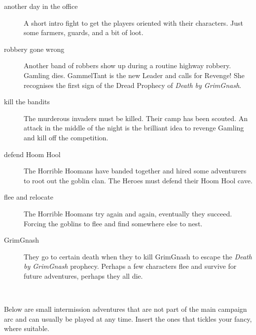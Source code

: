 \begin{description}

    \item[another day in the office] A short intro fight to get the players oriented with their characters. Just some farmers, guards, and a bit of loot.

    \item[robbery gone wrong] Another band of robbers show up during a routine highway robbery. Gamling dies. GammelTant is the new Leader and calls for Revenge! She recognises the first sign of the Dread Prophecy of \emph{Death by GrimGnash}.

    \item[kill the bandits] The murderous invaders must be killed. Their camp has been scouted. An attack in the middle of the night is the brilliant idea to revenge Gamling and kill off the competition.

    \item[defend Hoom Hool] The Horrible Hoomans have banded together and hired some adventurers to root out the goblin clan. The Heroes must defend their Hoom Hool cave.

    \item[flee and relocate] The Horrible Hoomans try again and again, eventually they succeed. Forcing the goblins to flee and find somewhere else to nest.

    \item[GrimGnash] They go to certain death when they to kill GrimGnash to escape the \emph{Death by GrimGnash} prophecy. Perhaps a few characters flee and survive for future adventures, perhaps they all die.

\end{description}

\


\noindent Below are small intermission adventures that are not part of the main campaign arc and can usually be played at any time. Insert the ones that tickles your fancy,  where suitable.

